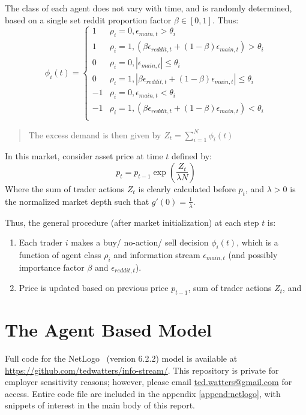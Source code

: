 \documentclass[a4paper, 11pt]{report}
\begin{document}
The class of each agent does not vary with time, and is randomly determined, based on a single set reddit proportion factor $\beta \in [0,1]$. Thus:
\begin{equation}
\phi_{i}(t) = \begin{cases}
	1 & \rho_{i}=0,\epsilon_{main,t}>\theta_{i} \\
	1 & \rho_{i}=1,(\beta \epsilon_{reddit,t} + (1-\beta)\epsilon_{main,t}) > \theta_{i}\\
	0 & \rho_{i}=0, |\epsilon_{main,t}| \leq \theta_{i} \\
	0 & \rho_{i}=1, |\beta \epsilon_{reddit,t} + (1-\beta)\epsilon_{main,t}| \leq \theta_{i} \\
	-1 & \rho_{i}=0,\epsilon_{main,t}<\theta_{i} \\
	-1 & \rho_{i}=1,(\beta \epsilon_{reddit,t} + (1-\beta)\epsilon_{main,t}) < \theta_{i}\\
\end{cases}
\end{equation}
\begin{quote}
	The excess demand is then given by $Z_{t} = \sum_{i=1}^{N} \phi_{i}(t)$
\end{quote}
In this market, consider asset price at time $t$ defined by:
\begin{equation}
	p_{t} = p_{t-1} \exp \left( \frac{ Z_{t}}{\lambda N}\right)
\end{equation}
Where the sum of trader actions $Z_{t}$ is clearly calculated before $p_{t}$, and $\lambda > 0$ is the normalized market depth such that $g'(0) = \frac{1}{\lambda}$. 

Thus, the general procedure (after market initialization) at each step $t$ is:
\begin{enumerate}
	\item Each trader $i$ makes a buy/ no-action/ sell decision $\phi_{i}(t)$, which is a function of agent class $\rho_{i}$ and information stream $\epsilon_{main,t}$ (and possibly importance factor $\beta$ and $\epsilon_{reddit,t}$).
	\item Price is updated based on previous price $p_{t-1}$, sum of trader actions $Z_{t}$, and 
\end{enumerate}
\section{The Agent Based Model}
	Full code for the NetLogo~\cite{netlogo} (version 6.2.2) model is available at \url{https://github.com/tedwatters/info-stream/}. This repository is private for employer sensitivity reasons; however, please email \url{ted.watters@gmail.com} for access. Entire code file are included in the appendix \autoref{append:netlogo}, with snippets of interest in the main body of this report.
	
\end{document}
